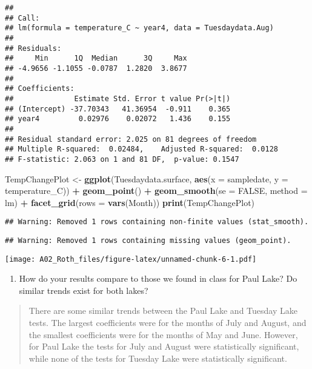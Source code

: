 \documentclass[]{article}
\newenvironment{Shaded}{\begin{snugshade}}{\end{snugshade}}
\newcommand{\DataTypeTok}[1]{\textcolor[rgb]{0.13,0.29,0.53}{#1}}
\newcommand{\KeywordTok}[1]{\textcolor[rgb]{0.13,0.29,0.53}{\textbf{#1}}}
\newcommand{\NormalTok}[1]{#1}
\newcommand{\OperatorTok}[1]{\textcolor[rgb]{0.81,0.36,0.00}{\textbf{#1}}}
\newcommand{\OtherTok}[1]{\textcolor[rgb]{0.56,0.35,0.01}{#1}}
\newcommand{\StringTok}[1]{\textcolor[rgb]{0.31,0.60,0.02}{#1}}
\providecommand{\tightlist}{%
  \setlength{\itemsep}{0pt}\setlength{\parskip}{0pt}}
\begin{document}
\begin{verbatim}
## 
## Call:
## lm(formula = temperature_C ~ year4, data = Tuesdaydata.Aug)
## 
## Residuals:
##     Min      1Q  Median      3Q     Max 
## -4.9656 -1.1055 -0.0787  1.2820  3.8677 
## 
## Coefficients:
##              Estimate Std. Error t value Pr(>|t|)
## (Intercept) -37.70343   41.36954  -0.911    0.365
## year4         0.02976    0.02072   1.436    0.155
## 
## Residual standard error: 2.025 on 81 degrees of freedom
## Multiple R-squared:  0.02484,    Adjusted R-squared:  0.0128 
## F-statistic: 2.063 on 1 and 81 DF,  p-value: 0.1547
\end{verbatim}

\begin{Shaded}
\begin{Highlighting}[]
\NormalTok{TempChangePlot <-}\StringTok{ }
\StringTok{  }\KeywordTok{ggplot}\NormalTok{(Tuesdaydata.surface, }\KeywordTok{aes}\NormalTok{(}\DataTypeTok{x =}\NormalTok{ sampledate, }\DataTypeTok{y =}\NormalTok{ temperature_C)) }\OperatorTok{+}
\StringTok{  }\KeywordTok{geom_point}\NormalTok{() }\OperatorTok{+}
\StringTok{  }\KeywordTok{geom_smooth}\NormalTok{(}\DataTypeTok{se =} \OtherTok{FALSE}\NormalTok{, }\DataTypeTok{method =}\NormalTok{ lm) }\OperatorTok{+}
\StringTok{  }\KeywordTok{facet_grid}\NormalTok{(}\DataTypeTok{rows =} \KeywordTok{vars}\NormalTok{(Month))}
\KeywordTok{print}\NormalTok{(TempChangePlot)}
\end{Highlighting}
\end{Shaded}

\begin{verbatim}
## Warning: Removed 1 rows containing non-finite values (stat_smooth).
\end{verbatim}

\begin{verbatim}
## Warning: Removed 1 rows containing missing values (geom_point).
\end{verbatim}

\texttt{[image: A02\_Roth\_files/figure-latex/unnamed-chunk-6-1.pdf]}

\begin{enumerate}
\def\labelenumi{\arabic{enumi}.}
\setcounter{enumi}{11}
\tightlist
\item
  How do your results compare to those we found in class for Paul Lake?
  Do similar trends exist for both lakes?
\end{enumerate}

\begin{quote}
There are some similar trends between the Paul Lake and Tuesday Lake
tests. The largest coefficients were for the months of July and August,
and the smallest coefficients were for the months of May and June.
However, for Paul Lake the tests for July and August were statistically
significant, while none of the tests for Tuesday Lake were statistically
significant.
\end{quote}
\end{document}
